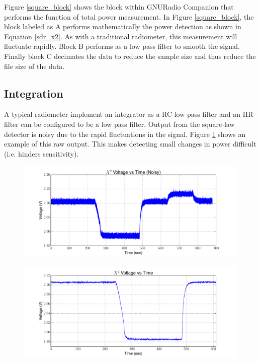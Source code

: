 Figure \ref{square_block} shows the block within GNURadio Companion that performs the function of total power measurement.  In Figure \ref{square_block}, the block labeled as A performs mathematically the power detection as shown in Equation \ref{sdr_x2}.  As with a traditional radiometer, this measurement will fluctuate rapidly.  Block B performs as a low pass filter to smooth the signal.  Finally block C decimates the data to reduce the sample size and thus reduce the file size of the data.  

\subsection{Integration}

A typical radiometer implement an integrator as a RC low pass filter and an IIR filter can be configured to be a low pass filter.  Output from the square-law detector is noisy due to the rapid fluctuations in the signal.  Figure \ref{square_raw} shows an example of this raw output.  This makes detecting small changes in power difficult (i.e. hinders sensitivity).  

{\begin{figure}[h!tb] 
\centering
\includegraphics[width=17cm]{Experiments/Exp1/noisy_voltage.pdf}
\label{square_raw}
\end{figure}
}

{\begin{figure}[h!tb] 
\centering
\includegraphics[width=17cm]{Experiments/Exp1/x2_filter.pdf}
\label{square_raw_filt}
\end{figure}
}

